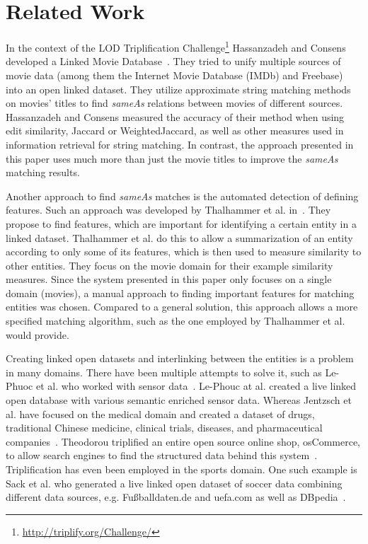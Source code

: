 \section{Related Work}
\label{sec_related_work}

In the context of the LOD Triplification Challenge\footnote{\url{http://triplify.org/Challenge/}} Hassanzadeh and Consens developed a Linked Movie Database~\cite{LMDB}.
They tried to unify multiple sources of movie data (among them the Internet Movie Database (IMDb) and Freebase) into an open linked dataset.
They utilize approximate string matching methods on movies' titles to find \textit{sameAs} relations between movies of different sources.
Hassanzadeh and Consens measured the accuracy of their method when using edit similarity, Jaccard or WeightedJaccard, as well as other measures used in information retrieval for string matching.
In contrast, the approach presented in this paper uses much more than just the movie titles to improve the \textit{sameAs} matching results.

Another approach to find \textit{sameAs} matches is the automated detection of defining features.
Such an approach was developed by Thalhammer et al. in~\cite{MovieSummarization}.
They propose to find features, which are important for identifying a certain entity in a linked dataset.
Thalhammer et al. do this to allow a summarization of an entity according to only some of its features, which is then used to measure similarity to other entities.
They focus on the movie domain for their example similarity measures.
Since the system presented in this paper only focuses on a single domain (movies), a manual approach to finding important features for matching entities was chosen.
Compared to a general solution, this approach allows a more specified matching algorithm, such as the one employed by Thalhammer et al. would provide.

Creating linked open datasets and interlinking between the entities is a problem in many domains.
There have been multiple attempts to solve it, such as Le-Phuoc et al. who worked with sensor data~\cite{SensorData}.
Le-Phouc at al. created a live linked open database with various semantic enriched sensor data.
Whereas Jentzsch et al. have focused on the medical domain and created a dataset of drugs, traditional Chinese medicine, clinical trials, diseases, and pharmaceutical companies~\cite{openDrugData}.
Theodorou triplified an entire open source online shop, osCommerce, to allow search engines to find the structured data behind this system~\cite{osCommerce}.
Triplification has even been employed in the sports domain.
One such example is Sack et al. who generated a live linked open dataset of soccer data combining different data sources, e.g. Fußballdaten.de and uefa.com as well as DBpedia~\cite{smm}.


